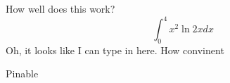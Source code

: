 \documentclass{article}
\begin{document}
How well does this work?
$$\int_0^4 x^2 \ln{2x}dx$$
Oh, it looks like I can type in here. 
How convinent

Pinable
\end{document}

